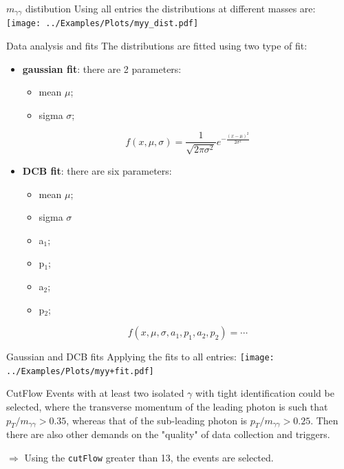 \documentclass[10pt,UKenglish, leqno, xcolor = dvipsnames]{beamer}
\begin{document}
		\begin{frame}{$m_{\gamma\gamma}$ distibution}
			\vfill
			Using all entries the distributions at different masses are:
			\texttt{[image: ../Examples/Plots/myy\_dist.pdf]}
			\vfill
		\end{frame}

		\begin{frame}{Data analysis and fits}
			\vfill
			The distributions are fitted using two type of fit:
			\begin{itemize}
				\item \textbf{gaussian fit}: there are 2 parameters:
				\begin{itemize}
					\item mean $\mu$;
					\item sigma $\sigma$;
				\end{itemize}
				$$
				f(x,\mu,\sigma)= \frac{1}{\sqrt{2\pi\sigma^2}}e^{-\frac{(x-\mu)^2}{2\sigma^2}}
				$$
				\item \textbf{DCB fit}: there are six parameters:
				\begin{itemize}
					\item mean $\mu$;
					\item sigma $\sigma$
					\item a$_1$;
					\item p$_1$;
					\item a$_2$;
					\item p$_2$;
				\end{itemize}
				$$
				f(x,\mu,\sigma,a_1,p_1,a_2,p_2) = \cdots
				$$
			\end{itemize}
			\vfill
		\end{frame}
	
		\begin{frame}{Gaussian and DCB fits}
			\vfill
			Applying the fits to all entries:
			\texttt{[image: ../Examples/Plots/myy+fit.pdf]}
			\vfill
		\end{frame}
	
		\begin{frame}{CutFlow}
			\vfill
			Events with at least two isolated $\gamma$ with tight identification could be selected, where the transverse momentum of the leading photon is such that $p_T/m_{\gamma\gamma} > 0.35$, whereas that of the sub-leading photon is $p_T/m_{\gamma\gamma} > 0.25$. Then there are also other demands on the "quality" of data collection and triggers.
			
			\vspace{0.5cm}
			$\Longrightarrow$ Using the \texttt{cutFlow} greater than 13, the events are selected.
			\vfill
		\end{frame}
	
\end{document}

